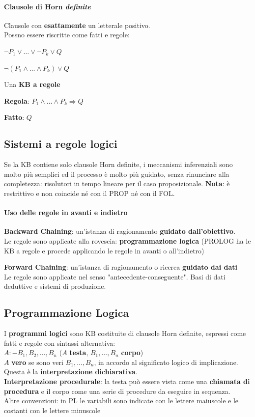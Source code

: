 \documentclass[10pt]{book}
\begin{document}
\paragraph{Clausole di Horn \textit{definite}} Clausole con \textbf{esattamente} un letterale positivo.\\
Possno essere riscritte come fatti e regole:
\begin{list}{}{}
	\item $\neg P_1 \vee \ldots \vee \neg P_k \vee Q$
	\item $\neg (P_1 \wedge \ldots \wedge P_k) \vee Q$
\end{list}
Una \textbf{KB a regole}
\begin{list}{}{}
	\item \textbf{Regola}: $P_1 \wedge \ldots \wedge P_k \Rightarrow Q$
	\item \textbf{Fatto}: $Q$
\end{list}
\subsection{Sistemi a regole logici}
Se la KB contiene solo clausole Horn definite, i meccanismi inferenziali sono molto più semplici ed il processo è molto più guidato, senza rinunciare alla completezza: risolutori in tempo lineare per il caso proposizionale. \textbf{Nota}: è restrittivo e non coincide né con il PROP né con il FOL.
\paragraph{Uso delle regole in avanti e indietro}
\begin{list}{}{}
	\item \textbf{Backward Chaining}: un'istanza di ragionamento \textbf{guidato dall'obiettivo}.\\
	Le regole sono applicate alla rovescia: \textbf{programmazione logica} (PROLOG ha le KB a regole e procede applicando le regole in avanti o all'indietro)
	\item \textbf{Forward Chaining}: un'istanza di ragionamento o ricerca \textbf{guidato dai dati}\\
	Le regole sono applicate nel senso "antecedente-conseguente". Basi di dati deduttive e sistemi di produzione.
\end{list}
\subsection{Programmazione Logica}
I \textbf{programmi logici} sono KB costituite di clausole Horn definite, espressi come fatti e regole con sintassi alternativa:\\
$A :- B_1, B_2, \ldots, B_n$ ($A$ \textbf{testa}, $B_1, \ldots, B_n$ \textbf{corpo})\\
$A$ \textbf{vero} se sono veri $B_1, \ldots, B_n$, in accordo al significato logico di implicazione. Questa è la \textbf{interpretazione dichiarativa}.\\
\textbf{Interpretazione procedurale}: la testa può essere vista come una \textbf{chiamata di procedura} e il corpo come una serie di procedure da eseguire in sequenza.\\
Altre convenzioni: in PL le variabili sono indicate con le lettere maiuscole e le costanti con le lettere minuscole
\end{document}
